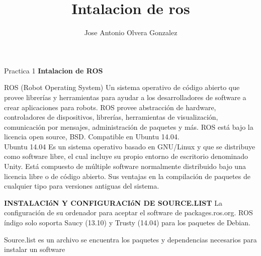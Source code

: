 \documentclass[12pt,letterpaper]{report}
\author{Jose Antonio Olvera Gonzalez }
\title{Intalacion de ros }
\begin{document}
Practica 1 \textbf{Intalacion de ROS}
\begin{flushleft}
ROS (Robot Operating System) Un sistema operativo de código abierto que provee librerías y herramientas para ayudar a los desarrolladores de software a crear aplicaciones para robots. ROS provee abstracción de hardware, controladores de dispositivos, librerías, herramientas de visualización, comunicación por mensajes, administración de paquetes y más. ROS está bajo la licencia open source, BSD. Compatible en Ubuntu 14.04.\\

Ubuntu 14.04 Es un sistema operativo basado en GNU/Linux y que se distribuye como software libre, el cual incluye su propio entorno de escritorio denominado Unity. Está compuesto de múltiple software normalmente distribuido bajo una licencia libre o de código abierto. Sus ventajas en la compilación de paquetes de cualquier tipo para versiones antiguas del sistema.
\begin{flushleft}
\textbf{INSTALACIóN Y CONFIGURACIóN DE SOURCE.LIST}
La configuración de su ordenador para aceptar el software de packages.ros.org. ROS índigo solo soporta Saucy (13.10) y Trusty (14.04) para los paquetes de Debian.

Source.list es un archivo se encuentra los paquetes y dependencias necesarios para instalar un software


\end{flushleft}
\end{flushleft}
\end{document}

